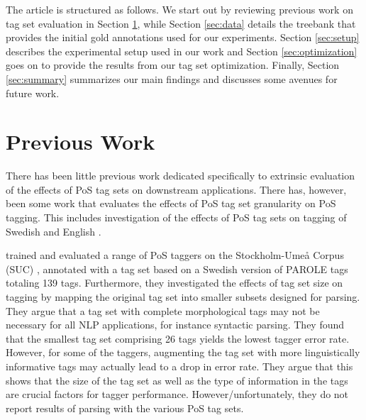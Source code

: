 \documentclass[11pt,a4paper]{article}
\begin{document}
The article is structured as follows. We start out by reviewing previous work
on tag set evaluation in Section \ref{sec:prev}, while Section \ref{sec:data}
details the treebank that provides the initial gold annotations used for our
experiments. Section \ref{sec:setup} describes the experimental setup used in
our work and Section \ref{sec:optimization} goes on to provide the results from
our tag set optimization. Finally, Section \ref{sec:summary} summarizes our
main findings and discusses some avenues for future work.

\section{Previous Work}
\label{sec:prev}
There has been little previous work dedicated specifically to
extrinsic evaluation of the effects of PoS tag sets on downstream
applications.  There has, however, been some work that evaluates the
effects of PoS tag set granularity on PoS tagging. This includes
investigation of the effects of PoS tag sets on tagging of Swedish
\cite{Meg:01,Meg:02} and English \cite{Mac:05}.


 trained and evaluated a range of PoS taggers on the
Stockholm-Umeå Corpus (SUC) \cite{Gus:Har:06}, annotated with a tag set based
on a Swedish version of PAROLE tags totaling 139 tags. Furthermore, they
investigated the effects of tag set size on tagging by mapping the original tag
set into smaller subsets designed for parsing. They argue that a tag set with
complete morphological tags may not be necessary for all NLP applications, for
instance syntactic parsing. They found that the smallest tag set comprising 26
tags yields the lowest tagger error rate.  However, for some of the taggers,
augmenting the tag set with more linguistically informative tags may actually
lead to a drop in error rate. They argue that this shows that the size of the
tag set as well as the type of information in the tags are crucial factors for
tagger performance.  However/unfortunately, they do not report results of
parsing with the various PoS tag sets.
\end{document}
